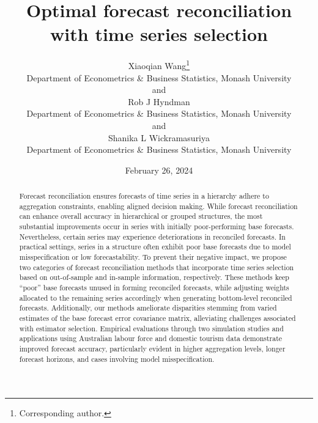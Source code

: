 \documentclass[
  11pt]{article}
\begin{document}
\def\spacingset#1{\renewcommand{\baselinestretch}%
{#1}\small\normalsize} \spacingset{1}

\renewcommand*{\arraystretch}{0.5} %


\date{February 26, 2024}
\title{\bf Optimal forecast reconciliation with time series selection}
\author{
Xiaoqian Wang\thanks{Corresponding author.} \vspace{0.2em}\\
Department of Econometrics \& Business Statistics, Monash
University \vspace{0.2em}\\
and \vspace{0.2em}\\Rob J Hyndman \vspace{0.2em}\\
Department of Econometrics \& Business Statistics, Monash
University \vspace{0.2em}\\
and \vspace{0.2em}\\Shanika L Wickramasuriya \vspace{0.2em}\\
Department of Econometrics \& Business Statistics, Monash
University \vspace{0.2em}\\
}
\maketitle

\bigskip
\bigskip
\begin{abstract}
Forecast reconciliation ensures forecasts of time series in a hierarchy
adhere to aggregation constraints, enabling aligned decision making.
While forecast reconciliation can enhance overall accuracy in
hierarchical or grouped structures, the most substantial improvements
occur in series with initially poor-performing base forecasts.
Nevertheless, certain series may experience deteriorations in reconciled
forecasts. In practical settings, series in a structure often exhibit
poor base forecasts due to model misspecification or low
forecastability. To prevent their negative impact, we propose two
categories of forecast reconciliation methods that incorporate time
series selection based on out-of-sample and in-sample information,
respectively. These methods keep ``poor'' base forecasts unused in
forming reconciled forecasts, while adjusting weights allocated to the
remaining series accordingly when generating bottom-level reconciled
forecasts. Additionally, our methods ameliorate disparities stemming
from varied estimates of the base forecast error covariance matrix,
alleviating challenges associated with estimator selection. Empirical
evaluations through two simulation studies and applications using
Australian labour force and domestic tourism data demonstrate improved
forecast accuracy, particularly evident in higher aggregation levels,
longer forecast horizons, and cases involving model misspecification.
\end{abstract}
\end{document}
